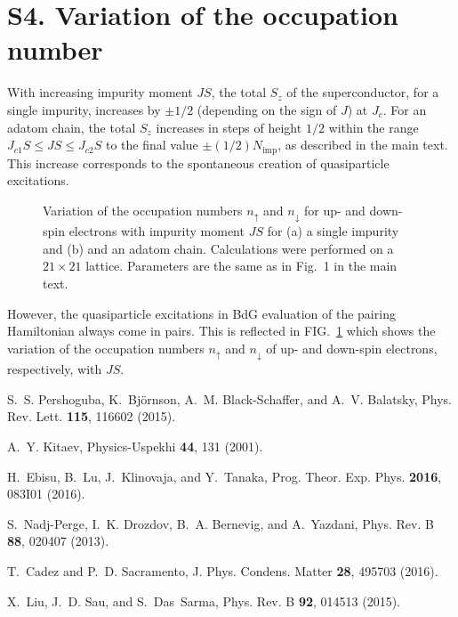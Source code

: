 \documentclass[aps,prl,reprint,nobibnotes]{revtex4-1}
\begin{document}
\section{S4. Variation of the occupation number}
With increasing impurity moment $JS$, the total $S_z$ of the superconductor, for a single impurity, increases by $\pm1/2$ (depending on the sign of $J$) at $J_{c}$. For an adatom chain, the total $S_z$ increases in steps of height $1/2$ within the range $J_{c1}S \leq JS \leq J_{c2}S$ to the final value $\pm(1/2) N_{\text{imp}}$, as described in the main text. This increase corresponds to the spontaneous creation of quasiparticle excitations.  
\begin{figure}[htb!]
\begin{center}
\caption{Variation of the occupation numbers $n_{\uparrow}$ and $n_{\downarrow}$ for up- and down-spin electrons with impurity moment $JS$ for (a) a single impurity and (b) and an adatom chain. Calculations were performed on a $21\times21$ lattice. Parameters are the same as in Fig.~1 in the main text.} 
\label{occupation}
\end{center}
\end{figure}
However, the quasiparticle excitations in BdG evaluation of the pairing Hamiltonian always come in pairs. This is reflected in FIG.~\ref{occupation} which shows the variation of the occupation numbers $n_{\uparrow}$ and $n_{\downarrow}$ of up- and down-spin electrons, respectively, with $JS$.



%

\begin{thebibliography}{11}

S.~S. Pershoguba, K.~Bj\"ornson, A.~M. Black-Schaffer, and A.~V. Balatsky,
\newblock Phys. Rev. Lett. {\bf 115}, 116602 (2015).

A.~Y. Kitaev,
\newblock Physics-Uspekhi {\bf 44}, 131 (2001).

H.~Ebisu, B.~Lu, J.~Klinovaja, and Y.~Tanaka,
\newblock Prog. Theor. Exp. Phys. {\bf 2016}, 083I01 (2016).

S.~Nadj-Perge, I.~K. Drozdov, B.~A. Bernevig, and A.~Yazdani,
\newblock Phys. Rev. B {\bf 88}, 020407 (2013).

T.~Cadez and P.~D. Sacramento,
\newblock J. Phys. Condens. Matter {\bf 28}, 495703 (2016).

X.~Liu, J.~D. Sau, and S.~Das~Sarma,
\newblock Phys. Rev. B {\bf 92}, 014513 (2015).

\end{thebibliography}
\end{document}
